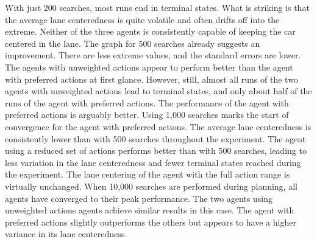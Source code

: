 With just 200 searches, most runs end in terminal states. What is striking is that the average lane centeredness is quite volatile and often drifts off into the extreme. Neither of the three agents is consistently capable of keeping the car centered in the lane. The graph for 500 searches already suggests an improvement. There are less extreme values, and the standard errors are lower. The agents with unweighted actions appear to perform better than the agent with preferred actions at first glance. However, still, almost all runs of the two agents with unweighted actions lead to terminal states, and only about half of the runs of the agent with preferred actions. The performance of the agent with preferred actions is arguably better. Using 1,000 searches marks the start of convergence for the agent with preferred actions. The average lane centeredness is consistently lower than with 500 searches throughout the experiment. The agent using a reduced set of actions performs better than with 500 searches, leading to less variation in the lane centeredness and fewer terminal states reached during the experiment. The lane centering of the agent with the full action range is virtually unchanged. When 10,000 searches are performed during planning, all agents have converged to their peak performance. The two agents using unweighted actions agents achieve similar results in this case. The agent with preferred actions slightly outperforms the others but appears to have a higher variance in its lane centeredness.







% 




